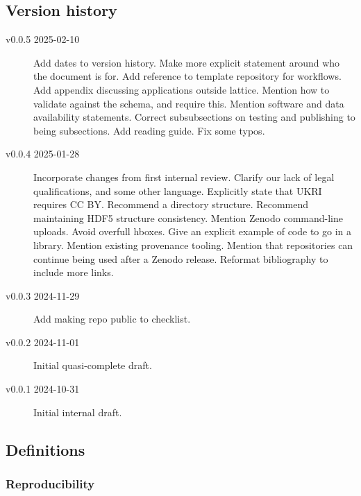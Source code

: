 \documentclass{article}
\begin{document}
\subsection{Version history}

\begin{description}
  \item[v0.0.5 2025-02-10]
        Add dates to version history.
        Make more explicit statement around who the document is for.
        Add reference to template repository for workflows.
        Add appendix discussing applications outside lattice.
        Mention how to validate against the schema,
        and require this.
        Mention software and data availability statements.
        Correct subsubsections on testing and publishing to being subsections.
        Add reading guide.
        Fix some typos.
  \item[v0.0.4 2025-01-28]
        Incorporate changes from first internal review.
        Clarify our lack of legal qualifications,
        and some other language.
        Explicitly state that UKRI requires CC BY\@.
        Recommend a directory structure.
        Recommend maintaining HDF5 structure consistency.
        Mention Zenodo command-line uploads.
        Avoid overfull hboxes.
        Give an explicit example of code to go in a library.
        Mention existing provenance tooling.
        Mention that repositories can continue being used after a Zenodo release.
        Reformat bibliography to include more links.
  \item[v0.0.3 2024-11-29]
        Add making repo public to checklist.
  \item[v0.0.2 2024-11-01]
        Initial quasi-complete draft.
  \item[v0.0.1 2024-10-31]
        Initial internal draft.
\end{description}

\subsection{Definitions}\label{sec:definitions}

\subsubsection{Reproducibility}\label{sec:reproducibility}
\end{document}
